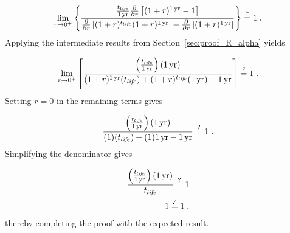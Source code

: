 \begin{equation}
  \lim_{r \to 0^+} 
  \left\{
    \frac{\frac{t_{li\!f\!e}}{1\,\mathrm{yr}}
      \frac{\partial}{\partial r} 
        \left[ (1 + r)^{1\,\mathrm{yr}} - 1 \right]}
    {\frac{\partial}{\partial r} \left[ (1 + r)^{t_{li\!f\!e}} (1 + r)^{1\,\mathrm{yr}} \right] - 
     \frac{\partial}{\partial r} \left[ (1 + r)^{1\,\mathrm{yr}} \right]}
  \right\} \stackrel{?}{=} 1 \; .
\end{equation}
%
Applying the intermediate results from Section~\ref{sec:proof_R_alpha} yields

\begin{equation}
  \lim_{r \to 0^+} 
  \left[
    \frac{\left(\frac{t_{li\!f\!e}}{1\,\mathrm{yr}}\right) (1\,\mathrm{yr})}
         {(1 + r)^{1\,\mathrm{yr}} (t_{li\!f\!e}) + 
          (1 + r)^{t_{li\!f\!e}} (1\,\mathrm{yr}) - 
          1\,\mathrm{yr}}
  \right] \stackrel{?}{=} 1 \; .
\end{equation}
%
Setting $r = 0$ in the remaining terms gives

\begin{equation}
  \frac{\left( \frac{t_{li\!f\!e}}{1\,\mathrm{yr}} \right) (1\,\mathrm{yr})}
  {(1) (t_{li\!f\!e}) + (1) 1\,\mathrm{yr} - 1\,\mathrm{yr}} \stackrel{?}{=} 1 \; .
\end{equation}
%
Simplifying the denominator gives

\begin{align}
  \frac{\left( \frac{t_{li\!f\!e}}{1\,\mathrm{yr}} \right) (1\,\mathrm{yr})}
       {t_{li\!f\!e}} \stackrel{?}{=} 1 \\
       1 \stackrel{\checkmark}{=} 1 \; ,
\end{align}
%
thereby completing the proof with the expected result.
